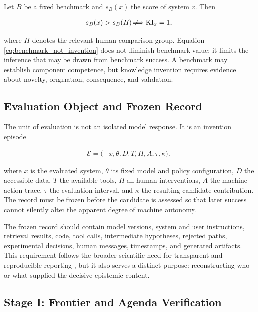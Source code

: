 Let $B$ be a fixed benchmark and $s_B(x)$ the score of system $x$. Then

\begin{equation}
\begin{aligned}
s_B(x) > s_B(H)
\not\!\Longrightarrow
\operatorname{KI}_{x}=1,
\end{aligned}
\label{eq:benchmark_not_invention}
\end{equation}

where $H$ denotes the relevant human comparison group. Equation~
\eqref{eq:benchmark_not_invention} does not diminish benchmark value; it limits
the inference that may be drawn from benchmark success. A benchmark may
establish component competence, but knowledge invention requires evidence
about novelty, origination, consequence, and validation.

\subsection{\textbf{Evaluation Object and Frozen Record}}

The unit of evaluation is not an isolated model response. It is an invention
episode

\begin{equation}
\begin{aligned}
\mathcal{E}
=(&x,\theta,D,T,H,A,\tau,\kappa),
\end{aligned}
\label{eq:invention_episode}
\end{equation}

where $x$ is the evaluated system, $\theta$ its fixed model and policy
configuration, $D$ the accessible data, $T$ the available tools, $H$ all human
interventions, $A$ the machine action trace, $\tau$ the evaluation interval,
and $\kappa$ the resulting candidate contribution. The record must be frozen
before the candidate is assessed so that later success cannot silently alter
the apparent degree of machine autonomy.

The frozen record should contain model versions, system and user instructions,
retrieval results, code, tool calls, intermediate hypotheses, rejected paths,
experimental decisions, human messages, timestamps, and generated artifacts.
This requirement follows the broader scientific need for transparent and
reproducible reporting \cite{munafo2017reproducible}, but it also serves a
distinct purpose: reconstructing who or what supplied the decisive epistemic
content.

\subsection{\textbf{Stage I: Frontier and Agenda Verification}}

